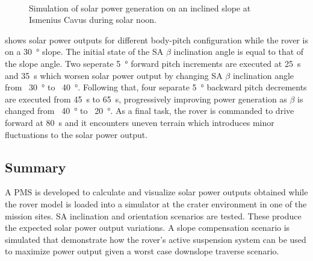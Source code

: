 \begin{figure}[h]
\begin{subfigure}[t]{\subfigureWidth}
		\label{fig:sub:rover-slope-compensation-power-profile}
	\end{subfigure}\\[0.8ex]
    \caption[Simulation of solar power generation on an inclined slope]
            {Simulation of solar power generation on an inclined slope at Ismenius Cavus during solar noon.}
    \label{fig:rover-slope-compensation}
\vspace{-2ex}
\end{figure}

\clearpage

 shows solar power outputs for different body-pitch configuration while the rover is on a \SI{30}{\degree} slope. The initial state of the \ac{SA} $\beta$ inclination angle is equal to that of the slope angle. Two seperate \SI{5}{\degree} forward pitch increments are executed at \SI{25}{\second} and \SI{35}{\second} which worsen solar power output by changing \ac{SA} $\beta$ inclination angle from ~\SI{30}{\degree} to ~\SI{40}{\degree}. Following that, four separate \SI{5}{\degree} backward pitch decrements are executed from \SI{45}{\second} to \SI{65}{\second}, progressively improving power generation as $\beta$ is changed from ~\SI{40}{\degree} to ~\SI{20}{\degree}. As a final task, the rover is commanded to drive forward at \SI{80}{\second} and it encounters uneven terrain which introduces minor fluctuations to the solar power output.


\subsection{Summary}
A \ac{PMS} is developed to calculate and visualize solar power outputs obtained while the rover model is loaded into a simulator at the crater environment in one of the mission sites. \ac{SA} inclination and orientation scenarios are tested. These produce the expected solar power output variations. A slope compensation scenario is simulated that demonstrate how the rover's active suspension system can be used to maximize power output given a worst case downslope traverse scenario.
